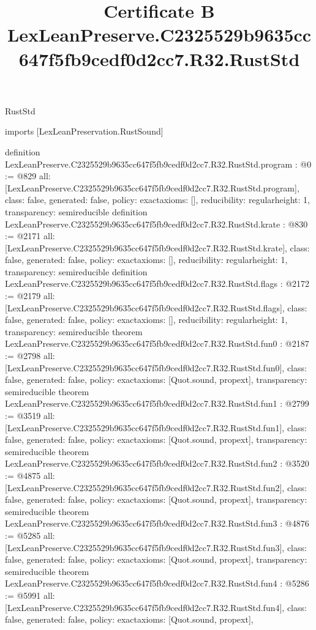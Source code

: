 \begin{lexlean}{RustStd}
\title{Certificate B LexLeanPreserve.C2325529b9635cc647f5fb9cedf0d2cc7.R32.RustStd}
\begin{coremodule}
imports [LexLeanPreservation.RustSound]

definition LexLeanPreserve.C2325529b9635cc647f5fb9cedf0d2cc7.R32.RustStd.program : @0 := @829 {
  all: [LexLeanPreserve.C2325529b9635cc647f5fb9cedf0d2cc7.R32.RustStd.program],
  class: false,
  generated: false,
  policy: exact{axioms: []},
  reducibility: regular{height: 1},
  transparency: semireducible
}
definition LexLeanPreserve.C2325529b9635cc647f5fb9cedf0d2cc7.R32.RustStd.krate : @830 := @2171 {
  all: [LexLeanPreserve.C2325529b9635cc647f5fb9cedf0d2cc7.R32.RustStd.krate],
  class: false,
  generated: false,
  policy: exact{axioms: []},
  reducibility: regular{height: 1},
  transparency: semireducible
}
definition LexLeanPreserve.C2325529b9635cc647f5fb9cedf0d2cc7.R32.RustStd.flags : @2172 := @2179 {
  all: [LexLeanPreserve.C2325529b9635cc647f5fb9cedf0d2cc7.R32.RustStd.flags],
  class: false,
  generated: false,
  policy: exact{axioms: []},
  reducibility: regular{height: 1},
  transparency: semireducible
}
theorem LexLeanPreserve.C2325529b9635cc647f5fb9cedf0d2cc7.R32.RustStd.fun0 : @2187 := @2798 {
  all: [LexLeanPreserve.C2325529b9635cc647f5fb9cedf0d2cc7.R32.RustStd.fun0],
  class: false,
  generated: false,
  policy: exact{axioms: [Quot.sound, propext]},
  transparency: semireducible
}
theorem LexLeanPreserve.C2325529b9635cc647f5fb9cedf0d2cc7.R32.RustStd.fun1 : @2799 := @3519 {
  all: [LexLeanPreserve.C2325529b9635cc647f5fb9cedf0d2cc7.R32.RustStd.fun1],
  class: false,
  generated: false,
  policy: exact{axioms: [Quot.sound, propext]},
  transparency: semireducible
}
theorem LexLeanPreserve.C2325529b9635cc647f5fb9cedf0d2cc7.R32.RustStd.fun2 : @3520 := @4875 {
  all: [LexLeanPreserve.C2325529b9635cc647f5fb9cedf0d2cc7.R32.RustStd.fun2],
  class: false,
  generated: false,
  policy: exact{axioms: [Quot.sound, propext]},
  transparency: semireducible
}
theorem LexLeanPreserve.C2325529b9635cc647f5fb9cedf0d2cc7.R32.RustStd.fun3 : @4876 := @5285 {
  all: [LexLeanPreserve.C2325529b9635cc647f5fb9cedf0d2cc7.R32.RustStd.fun3],
  class: false,
  generated: false,
  policy: exact{axioms: [Quot.sound, propext]},
  transparency: semireducible
}
theorem LexLeanPreserve.C2325529b9635cc647f5fb9cedf0d2cc7.R32.RustStd.fun4 : @5286 := @5991 {
  all: [LexLeanPreserve.C2325529b9635cc647f5fb9cedf0d2cc7.R32.RustStd.fun4],
  class: false,
  generated: false,
  policy: exact{axioms: [Quot.sound, propext]},
}
\end{coremodule}
\end{lexlean}
